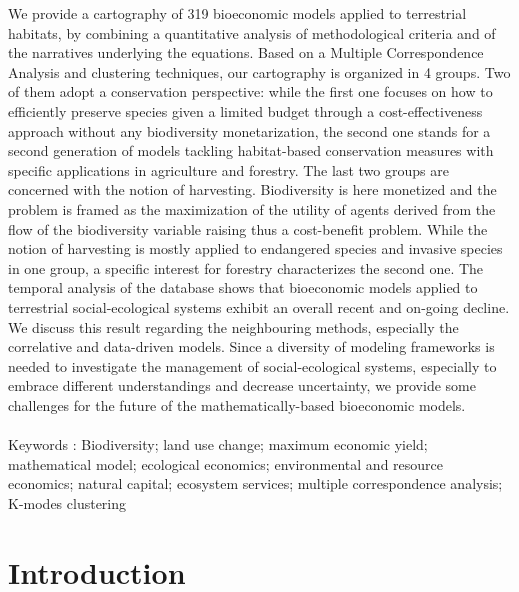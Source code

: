 \begin{center}
\begin{minipage}{0.9\textwidth}
\singlespacing
We provide a cartography of 319 bioeconomic models applied to terrestrial habitats, by combining a quantitative analysis of methodological criteria and of the narratives underlying the equations. Based on a Multiple Correspondence Analysis and clustering techniques, our cartography is organized in 4 groups. Two of them adopt a conservation perspective: while the first one focuses on how to efficiently preserve species given a limited budget through a cost-effectiveness approach without any biodiversity monetarization, the second one stands for a second generation of models tackling habitat-based conservation measures with specific applications in agriculture and forestry. The last two groups are concerned with the notion of harvesting. Biodiversity is here monetized and the problem is framed as the maximization of the 
utility of agents derived from the flow of the biodiversity variable raising thus a cost-benefit problem. While the notion of harvesting is mostly applied to endangered species and invasive species in one group, a specific interest for forestry characterizes the second one. The temporal analysis of the database shows that bioeconomic models applied to terrestrial social-ecological systems exhibit an overall recent and on-going decline. We discuss this result regarding the neighbouring methods, especially the correlative and data-driven models. Since a diversity of modeling frameworks is needed to investigate the management of social-ecological systems, especially to embrace different understandings and decrease uncertainty, we provide some challenges for the future of the mathematically-based bioeconomic models.
\\\\
Keywords : Biodiversity; land use change; maximum economic yield; mathematical model; ecological economics; environmental and resource economics; natural capital; ecosystem services; multiple correspondence analysis; K-modes clustering
\end{minipage}
\end{center}
    \vfill
\newpage

\section{Introduction}

